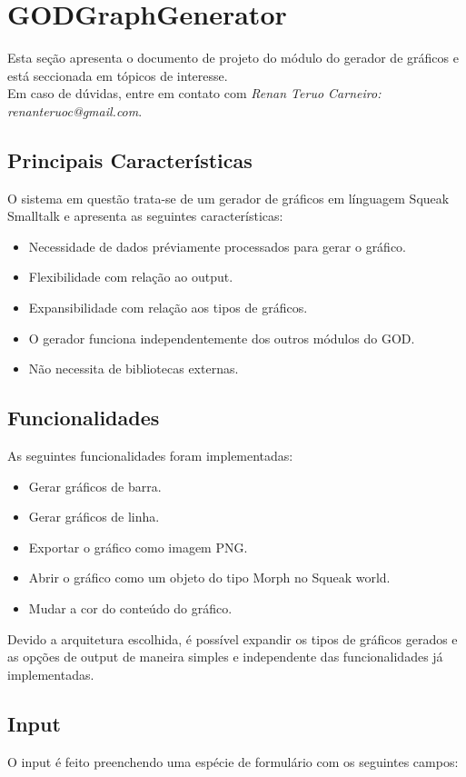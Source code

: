 \section{GODGraphGenerator}
	Esta seção apresenta o documento de projeto do módulo do gerador de gráficos e está seccionada em tópicos de
	interesse.\\

	Em caso de dúvidas, entre em contato com \emph{Renan Teruo Carneiro: renanteruoc@gmail.com}.

	\subsection{Principais Características}
		O sistema em questão trata-se de um gerador de gráficos em línguagem Squeak Smalltalk e apresenta as
		seguintes características:
		\begin{itemize}
			\item Necessidade de dados préviamente processados para gerar o gráfico.
			\item Flexibilidade com relação ao output.
			\item Expansibilidade com relação aos tipos de gráficos.
			\item O gerador funciona independentemente dos outros módulos do GOD.
			\item Não necessita de bibliotecas externas.
		\end{itemize}

	\subsection{Funcionalidades}
		As seguintes funcionalidades foram implementadas:
		\begin{itemize}
			\item Gerar gráficos de barra.
			\item Gerar gráficos de linha.
			\item Exportar o gráfico como imagem PNG.
			\item Abrir o gráfico como um objeto do tipo Morph no Squeak world.
			\item Mudar a cor do conteúdo do gráfico.
		\end{itemize}
		Devido a arquitetura escolhida, é possível expandir os tipos de gráficos gerados e as opções de
		output de maneira simples e independente das funcionalidades já implementadas.

	\subsection{Input}
		O input é feito preenchendo uma espécie de formulário com os seguintes campos:\\
		\\

